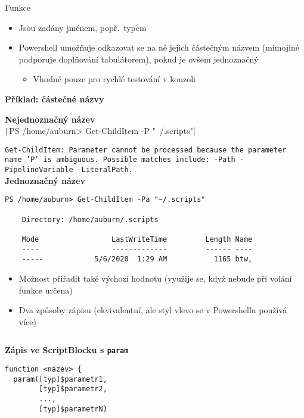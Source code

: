 \documentclass[main.tex]{subfiles}
\begin{document}
\begin{frame}{Funkce}
\begin{itemize}
  \item Jsou zadány jménem, popř.\ typem
  \item Powershell umožňuje odkazovat se na ně jejich částečným názvem (mimojiné podporuje doplňování tabulátorem), pokud je ovšem jednoznačný
    \begin{itemize}
      \item Vhodné pouze pro rychlé testování v konzoli
    \end{itemize}
\end{itemize}
\framebreak

{\large\textbf{Příklad: částečné názvy}}

\vspace{3mm}
 \textbf{Nejednoznačný název}\\
 \texttt|PS /home/auburn> Get-ChildItem -P "~/.scripts"|

{\color{red}\texttt{Get-ChildItem: Parameter cannot be processed because the parameter name 'P' is ambiguous. Possible matches include: -Path -PipelineVariable -LiteralPath.}}\\

 \textbf{Jednoznačný název}
\begin{verbatim}
PS /home/auburn> Get-ChildItem -Pa "~/.scripts"

    Directory: /home/auburn/.scripts

    Mode                 LastWriteTime         Length Name
    ----                 -------------         ------ ----
    -----            5/6/2020  1:29 AM           1165 btw,
\end{verbatim}
\framebreak

\begin{itemize}
  \item Možnost přiřadit také výchozí hodnotu (využije se, když nebude při volání funkce určena)
  \item Dva způsoby zápisu (ekvivalentní, ale styl vlevo se v Powershellu používá více)
\end{itemize}
\begin{columns}[t]
  \begin{column}{0.4\textwidth}
    \small\textbf{Zápis ve ScriptBlocku s \texttt{param}}
\begin{verbatim}
function <název> {
  param([typ]$parametr1,
        [typ]$parametr2,
        ...,
        [typ]$parametrN)


\end{verbatim}
\end{column}
\end{columns}
\end{frame}
\end{document}
